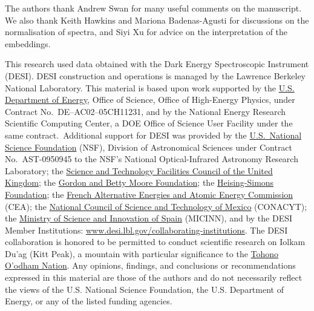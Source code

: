 \documentclass[fleqn,usenatbib]{mnras}
\begin{document}
The authors thank Andrew Swan for many useful comments on the manuscript.
We also thank Keith Hawkins and Mariona Badenas-Agusti for discussions on the normalisation of spectra, and Siyi Xu for advice on the interpretation of the embeddings.

This research used data obtained with the Dark Energy Spectroscopic Instrument (DESI).
DESI construction and operations is managed by the Lawrence Berkeley National Laboratory.
This material is based upon work supported by the \href{https://www.energy.gov/}{U.S. Department of Energy}, Office of Science, Office of High-Energy Physics, under Contract No.\ DE--AC02--05CH11231, and by the National Energy Research Scientific Computing Center, a DOE Office of Science User Facility under the same contract.\
Additional support for DESI was provided by the \href{https://www.nsf.gov/}{U.S.\ National Science Foundation} (NSF), Division of Astronomical Sciences under Contract No.\ AST-0950945 to the NSF's National Optical-Infrared Astronomy Research Laboratory;
the \href{https://stfc.ukri.org/}{Science and Technology Facilities Council of the United Kingdom};
the \href{https://www.moore.org/}{Gordon and Betty Moore Foundation};
the \href{https://www.hsfoundation.org/}{Heising-Simons Foundation};
the \href{http://www.cea.fr/}{French Alternative Energies and Atomic Energy Commission} (CEA);
the \href{https://www.conacyt.gob.mx/}{National Council of Science and Technology of Mexico} (CONACYT);
the \href{http://www.mineco.gob.es/}{Ministry of Science and Innovation of Spain} (MICINN), and by the DESI Member Institutions: \url{www.desi.lbl.gov/collaborating-institutions}.
The DESI collaboration is honored to be permitted to conduct scientific research on Iolkam Du'ag (Kitt Peak), a mountain with particular significance to the \href{http://www.tonation-nsn.gov/}{Tohono O'odham Nation}.
Any opinions, findings, and conclusions or recommendations expressed in this material are those of the authors and do not necessarily reflect the views of the U.S. National Science Foundation, the U.S. Department of Energy, or any of the listed funding agencies.
\end{document}
